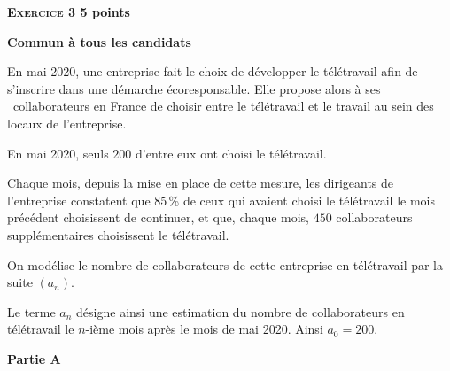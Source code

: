 \textbf{\large\textsc{Exercice 3} \hfill 5 points}

\textbf{Commun à tous les candidats}

\medskip

En mai 2020, une entreprise fait le choix de développer le télétravail afin de s'inscrire dans une démarche écoresponsable.
Elle propose alors à ses ~collaborateurs en France de choisir entre le télétravail et le travail au sein des locaux de l'entreprise.

En mai 2020, seuls $200$ d'entre eux ont choisi le télétravail.

Chaque mois, depuis la mise en place de cette mesure, les dirigeants de l'entreprise constatent que $85$\,\% de ceux qui avaient choisi le télétravail le mois précédent choisissent de continuer, et que, chaque mois, $450$ collaborateurs supplémentaires choisissent le télétravail.

On modélise le nombre de collaborateurs de cette entreprise en télétravail par la suite $\left(a_n\right)$.

Le terme $a_n$ désigne ainsi une estimation du nombre de collaborateurs en télétravail le $n$-ième mois après le mois de mai 2020. Ainsi $a_0 = 200$.

\bigskip

\textbf{Partie A}

\medskip

